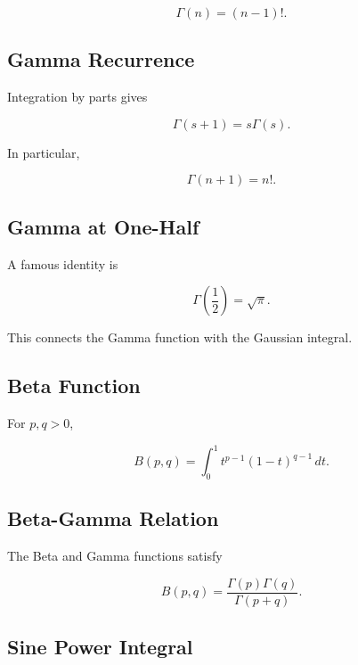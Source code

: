 \[
\boxed{
\Gamma(n)
=
(n-1)!.
}
\]

\subsection{Gamma Recurrence}
\label{subsec:gamma-recurrence-integral}

Integration by parts gives

\[
\boxed{
\Gamma(s+1)
=
s\Gamma(s).
}
\]

In particular,

\[
\boxed{
\Gamma(n+1)
=
n!.
}
\]

\subsection{Gamma at One-Half}
\label{subsec:gamma-one-half}

A famous identity is

\[
\boxed{
\Gamma
\left(
\frac12
\right)
=
\sqrt{\pi}.
}
\]

This connects the Gamma function with the Gaussian integral.

\subsection{Beta Function}
\label{subsec:beta-function-integral-reference}

For \(p,q>0\),

\[
\boxed{
B(p,q)
=
\int_0^1
t^{p-1}
(1-t)^{q-1}
\,dt.
}
\]

\subsection{Beta-Gamma Relation}
\label{subsec:beta-gamma-relation}

The Beta and Gamma functions satisfy

\[
\boxed{
B(p,q)
=
\frac{
\Gamma(p)\Gamma(q)
}{
\Gamma(p+q)
}.
}
\]

\subsection{Sine Power Integral}
\label{subsec:sine-power-definite-integral}

